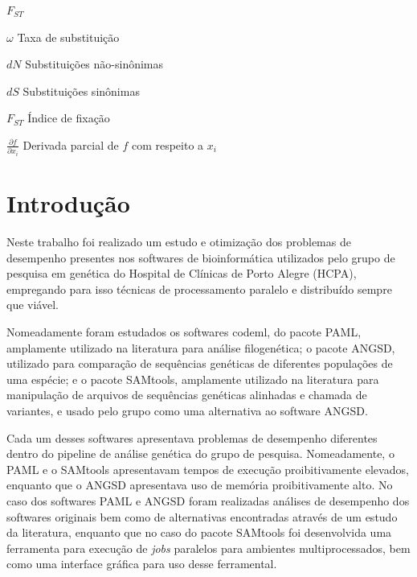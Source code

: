 \documentclass[cic,tc]{iiufrgs}
\begin{document}
\begin{listofsymbols}{$F_{ST}$}
    \item[$\omega$] Taxa de substituição
    \item[$dN$] Substituições não-sinônimas
    \item[$dS$] Substituições sinônimas
    \item[$F_{ST}$] Índice de fixação
    \item[$\frac{\partial f}{\partial x_i}$] Derivada parcial de $f$ com respeito a $x_i$
\end{listofsymbols}

\tableofcontents


\chapter{Introdução}

Neste trabalho foi realizado um estudo e otimização dos problemas de desempenho
presentes nos softwares de bioinformática utilizados pelo grupo de pesquisa em
genética do Hospital de Clínicas de Porto Alegre (HCPA), empregando para isso
técnicas de processamento paralelo e distribuído sempre que viável.

Nomeadamente foram estudados os softwares codeml, do pacote
PAML,\cite{yang2007paml} amplamente utilizado na literatura para análise
filogenética;\cite{maldonado2016lmap} o pacote ANGSD, utilizado para comparação
de sequências genéticas de diferentes populações de uma
espécie;\cite{korneliussen2014angsd} e o pacote SAMtools, amplamente utilizado
na literatura para manipulação de arquivos de sequências genéticas
alinhadas e chamada de variantes,\cite{danecek2021twelve} e usado pelo grupo
como uma alternativa ao software ANGSD.

Cada um desses softwares apresentava problemas de desempenho diferentes dentro
do pipeline de análise genética do grupo de pesquisa. Nomeadamente, o PAML e o
SAMtools apresentavam tempos de execução proibitivamente elevados, enquanto que
o ANGSD apresentava uso de memória proibitivamente alto. No caso dos softwares
PAML e ANGSD foram realizadas análises de desempenho dos softwares originais
bem como de alternativas encontradas através de um estudo da literatura,
enquanto que no caso do pacote SAMtools foi desenvolvida uma ferramenta para
execução de \textit{jobs} paralelos para ambientes multiprocessados, bem como
uma interface gráfica para uso desse ferramental.
\end{document}
